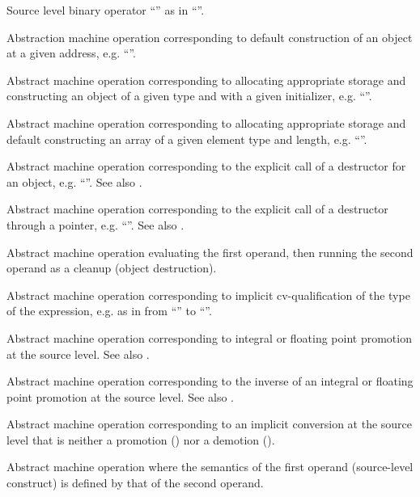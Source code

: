 Source level binary operator ``\code{[]}'' as in ``''.

Abstraction machine operation corresponding to default construction of an object at a given address, e.g. ``''.

Abstract machine operation corresponding to allocating appropriate storage and constructing an object of a given type 
and with a given initializer, e.g. ``''.

Abstract machine operation corresponding to allocating appropriate storage and default constructing an array of a given element type and length, 
e.g. ``''. 

Abstract machine operation corresponding to the explicit call of a destructor for an object, e.g. ``''.
See also .

Abstract machine operation corresponding to the explicit call of a destructor through a pointer, e.g. ``''.
See also .

Abstract machine operation evaluating the first operand, then running the second operand as a cleanup (object destruction).

Abstract machine operation corresponding to implicit cv-qualification of the type of the expression, 
e.g. as in from ``'' to ``''.

Abstract machine operation corresponding to integral or floating point promotion at the source level.
See also .

Abstract machine operation corresponding to the inverse of an integral or floating point promotion at the source level.
See also .

Abstract machine operation corresponding to an implicit conversion at the source level that is neither 
a promotion () nor a demotion ().

Abstract machine operation where the semantics of the first operand (source-level construct) is defined by that of the second operand.

